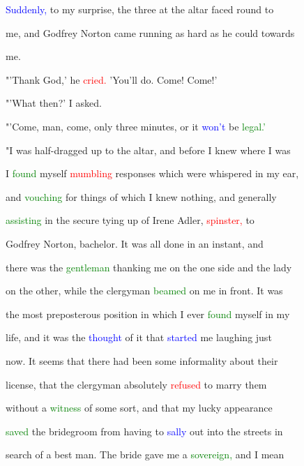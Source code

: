  \textcolor{blue}{Suddenly,} to my \textcolor{BurntOrange}{surprise,} the three at the altar faced round to

 me, and Godfrey Norton came running as hard as he could towards

 me.



 "'Thank \textcolor{BurntOrange}{God,'} he \textcolor{red}{cried.} 'You'll do. Come! Come!'



 "'What then?' I asked.



 "'Come, man, come, only three minutes, or it \textcolor{blue}{won't} be \textcolor{green}{legal.'}



 "I was half-dragged up to the altar, and before I knew where I was

 I \textcolor{green}{found} myself \textcolor{red}{mumbling} responses which were whispered in my ear,

 and \textcolor{green}{vouching} for things of which I knew nothing, and generally

 \textcolor{green}{assisting} in the secure tying up of Irene Adler, \textcolor{red}{spinster,} to

 Godfrey Norton, bachelor. It was all done in an instant, and

 there was the \textcolor{green}{gentleman} thanking me on the one side and the lady

 on the other, while the clergyman \textcolor{green}{beamed} on me in front. It was

 the most preposterous position in which I ever \textcolor{green}{found} myself in my

 life, and it was the \textcolor{blue}{thought} of it that \textcolor{blue}{started} me \textcolor{BurntOrange}{laughing} just

 now. It seems that there had been some informality about their

 license, that the clergyman absolutely \textcolor{red}{refused} to \textcolor{BurntOrange}{marry} them

 without a \textcolor{green}{witness} of some sort, and that my \textcolor{BurntOrange}{lucky} appearance

 \textcolor{green}{saved} the \textcolor{BurntOrange}{bridegroom} from having to \textcolor{blue}{sally} out into the streets in

 search of a best man. The \textcolor{BurntOrange}{bride} gave me a \textcolor{green}{sovereign,} and I mean

